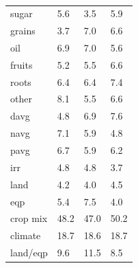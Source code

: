\documentclass[12pt]{article}
\begin{document}
\begin{table}[h!]
{\begin{tabular}{llll}
sugar & 5.6 & 3.5 & 5.9 \\
grains & 3.7 & 7.0 & 6.6 \\
oil & 6.9 & 7.0 & 5.6 \\
fruits & 5.2 & 5.5 & 6.6 \\
roots & 6.4 & 6.4 & 7.4 \\
other & 8.1 & 5.5 & 6.6 \\
davg & 4.8 & 6.9 & 7.6 \\
navg & 7.1 & 5.9 & 4.8 \\
pavg & 6.7 & 5.9 & 6.2 \\
irr & 4.8 & 4.8 & 3.7 \\
land & 4.2 & 4.0 & 4.5 \\
eqp & 5.4 & 7.5 & 4.0 \\
\midrule
crop mix & 48.2 & 47.0 & 50.2 \\
climate & 18.7 & 18.6 & 18.7 \\
land/eqp & 9.6 & 11.5 & 8.5 \\
\bottomrule
\end{tabular}
\caption{ }
\label{t.wy.trop_percentages}
}
\end{table}
\end{document}
